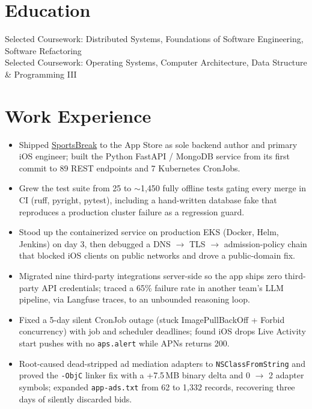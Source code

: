\documentclass[11pt, letterpaper]{article}
\begin{document}

\section{Education}
Selected Coursework: Distributed Systems, Foundations of Software Engineering, Software Refactoring\\[1pt]
Selected Coursework: Operating Systems, Computer Architecture, Data Structure \& Programming III

\section{Work Experience}
\begin{itemize}
  \item Shipped \href{https://apps.apple.com/app/id6762649287}{SportsBreak} to the App Store as sole backend author and primary iOS engineer; built the Python FastAPI / MongoDB service from its first commit to 89 REST endpoints and 7 Kubernetes CronJobs.
  \item Grew the test suite from 25 to $\sim$1{,}450 fully offline tests gating every merge in CI (ruff, pyright, pytest), including a hand-written database fake that reproduces a production cluster failure as a regression guard.
  \item Stood up the containerized service on production EKS (Docker, Helm, Jenkins) on day 3, then debugged a DNS $\to$ TLS $\to$ admission-policy chain that blocked iOS clients on public networks and drove a public-domain fix.
  \item Migrated nine third-party integrations server-side so the app ships zero third-party API credentials; traced a 65\% failure rate in another team's LLM pipeline, via Langfuse traces, to an unbounded reasoning loop.
  \item Fixed a 5-day silent CronJob outage (stuck ImagePullBackOff + Forbid concurrency) with job and scheduler deadlines; found iOS drops Live Activity start pushes with no \texttt{aps.alert} while APNs returns 200.
  \item Root-caused dead-stripped ad mediation adapters to \texttt{NSClassFromString} and proved the \texttt{-ObjC} linker fix with a +7.5\,MB binary delta and 0 $\to$ 2 adapter symbols; expanded \texttt{app-ads.txt} from 62 to 1{,}332 records, recovering three days of silently discarded bids.
\end{itemize}
\end{document}
